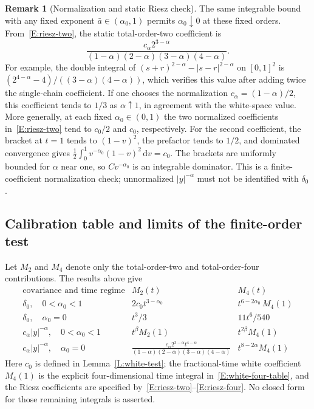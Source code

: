 \documentclass[12pt,oneside,openany]{book}
\numberwithin{equation}{section}
\theoremstyle{nogostyle}
\theoremstyle{definition}
\newtheorem{remark}[theorem]{Remark}
\newcommand{\ud}{\,\mathrm{d}}
\begin{document}
\begin{remark}[Normalization and static Riesz check]\label{R:riesz-static}
  The same integrable bound with any fixed exponent $\bar{a} \in (\alpha_0,1)$
  permits $\alpha_0\downarrow0$ at these fixed orders. From~\eqref{E:riesz-two},
  the static total-order-two coefficient is
  \[
    \frac{c_\alpha2^{3-\alpha}}
    {(1-\alpha)(2-\alpha)(3-\alpha)(4-\alpha)}.
  \]
  For example, the double integral of $(s+r)^{2-\alpha}-|s-r|^{2-\alpha}$ on
  $[0,1]^2$ is $(2^{4-\alpha}-4)/((3-\alpha)(4-\alpha))$, which verifies this
  value after adding twice the single-chain coefficient. If one chooses the
  normalization $c_\alpha = (1-\alpha)/2$, this coefficient tends to $1/3$ as
  $\alpha\uparrow1$, in agreement with the white-space value. More generally, at
  each fixed $\alpha_0 \in (0,1)$ the two normalized coefficients
  in~\eqref{E:riesz-two} tend to $c_0/2$ and $c_0$, respectively. For the second
  coefficient, the bracket at $t = 1$ tends to $(1-v)^2$, the prefactor tends to
  $1/2$, and dominated convergence gives $\frac12\int_0^1v^{-\alpha_0}(1-v)^2\ud
  v = c_0$. The brackets are uniformly bounded for $\alpha$ near one, so
  $Cv^{-\alpha_0}$ is an integrable dominator. This is a finite-coefficient
  normalization check; unnormalized $|y|^{-\alpha}$ must not be identified with
  $\delta_0$.
\end{remark}

\subsection{Calibration table and limits of the finite-order test}

Let $M_2$ and $M_4$ denote only the total-order-two and total-order-four
contributions. The results above give
\[
  \begin{array}{c|c|c}
    \text{covariance and time regime}&M_2(t)&M_4(t)\\ \hline
    \delta_0,\quad0<\alpha_0<1
    &2c_0t^{3-\alpha_0}&t^{6-2\alpha_0}\,M_4(1)\\
    \delta_0,\quad\alpha_0=0
    &t^3/3&11t^6/540\\
    c_\alpha|y|^{-\alpha},\quad0<\alpha_0<1
    &t^\beta M_2(1)&t^{2\beta}M_4(1)\\
    c_\alpha|y|^{-\alpha},\quad\alpha_0=0
    &\displaystyle\frac{c_\alpha2^{3-\alpha}t^{4-\alpha}}
    {(1-\alpha)(2-\alpha)(3-\alpha)(4-\alpha)}
    &t^{8-2\alpha}M_4(1)
  \end{array}
\]
Here $c_0$ is defined in Lemma~\ref{L:white-test}; the fractional-time white
coefficient $M_4(1)$ is the explicit four-dimensional time integral
in~\eqref{E:white-four-table}, and the Riesz coefficients are specified
by~\eqref{E:riesz-two}--\eqref{E:riesz-four}. No closed form for those remaining
integrals is asserted.
\end{document}
